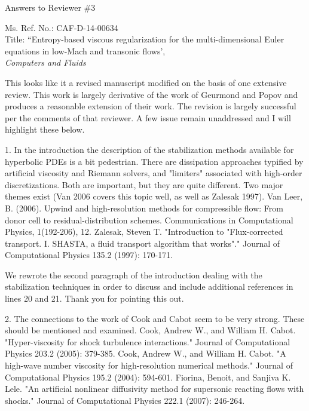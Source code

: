 \documentclass{article}
\newcommand{\tcr}[1]{\textcolor{red}{#1}}
\newcommand{\tcb}[1]{\textcolor{blue}{#1}}
\begin{document}

\begin{center}
{ \Large Answers to Reviewer \#3}
\end{center}

\bigskip

\noindent Ms. Ref. No.: CAF-D-14-00634\\
Title: ``Entropy-based viscous regularization for the multi-dimensional Euler equations in low-Mach and transonic flows', \\
{\it Computers and Fluids}\\

\bigskip
\bigskip

{
\color{blue}
This looks like it a revised manuscript modified on the basis of one
extensive review.
This work is largely derivative of the work of Geurmond and Popov and
produces a reasonable extension of their work. The revision is largely
successful per the comments of that reviewer. A few issue remain
unaddressed and I will highlight these below.
}

\bigskip

{
\color{blue}
1. In the introduction the description of the stabilization methods
available for hyperbolic PDEs is a bit pedestrian. There are dissipation
approaches typified by artificial viscosity and Riemann solvers, and
"limiters" associated with high-order discretizations. Both are important,
but they are quite different. Two major themes exist (Van 2006 covers
this topic well, as well as Zalesak 1997).
Van Leer, B. (2006). Upwind and high-resolution methods for
compressible flow: From donor cell to residual-distribution schemes.
Communications in Computational Physics, 1(192-206), 12.
Zalesak, Steven T. "Introduction to "Flux-corrected transport. I. SHASTA,
a fluid transport algorithm that works"." Journal of Computational Physics
135.2 (1997): 170-171.}

We rewrote the second paragraph of the introduction dealing with the stabilization techniques
in order to discuss and include additional references in lines 20 and 21. Thank you for pointing this out.

\bigskip


{
\color{blue}
2. The connections to the work of Cook and Cabot seem to be very
strong. These should be mentioned and examined.
Cook, Andrew W., and William H. Cabot. "Hyper-viscosity for shock turbulence
interactions." Journal of Computational Physics 203.2 (2005):
379-385.
Cook, Andrew W., and William H. Cabot. "A high-wave number viscosity
for high-resolution numerical methods." Journal of Computational Physics
195.2 (2004): 594-601.
Fiorina, Benoit, and Sanjiva K. Lele. "An artificial nonlinear diffusivity
method for supersonic reacting flows with shocks." Journal of
Computational Physics 222.1 (2007): 246-264.}
\end{document}
